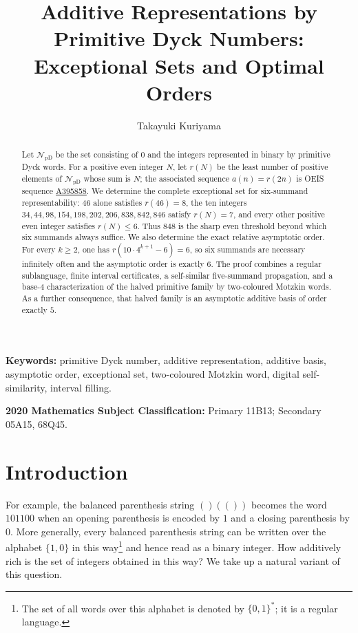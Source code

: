 \documentclass[12pt]{article}
\title{Additive Representations by Primitive Dyck Numbers:\\ Exceptional Sets and Optimal Orders}
\author{Takayuki Kuriyama}
\date{}
\theoremstyle{plain}
\theoremstyle{definition}
\theoremstyle{plain}
\newcommand{\NpD}{\mathcal{N}_{\mathrm{pD}}}
\newcommand{\seqnum}[1]{\href{https://oeis.org/#1}{\rm \underline{#1}}}
\begin{document}
\maketitle

\begin{abstract}
Let $\NpD$ be the set consisting of $0$ and the integers represented in
binary by primitive Dyck words.  For a positive even integer $N$, let $r(N)$
be the least number of positive elements of $\NpD$ whose sum is $N$; the
associated sequence $a(n)=r(2n)$ is OEIS sequence \seqnum{A395858}.  We
determine the complete exceptional set for six-summand representability:
$46$ alone satisfies $r(46)=8$, the ten integers
$34,44,98,154,198,202,206,838,842,846$ satisfy $r(N)=7$, and every other
positive even integer satisfies $r(N)\leq6$.  Thus $848$ is the sharp even
threshold beyond which six summands always suffice.  We also determine the
exact relative asymptotic order.  For every $k\geq2$, one has
$r(10\cdot4^{k+1}-6)=6$, so six summands are necessary infinitely often and the asymptotic order is
exactly $6$.  The proof combines a regular sublanguage, finite interval
certificates, a self-similar five-summand propagation, and a base-$4$
characterization of the halved primitive family by two-coloured Motzkin words.
As a further consequence, that halved family is an asymptotic additive basis
of order exactly $5$.
\end{abstract}

\noindent\textbf{Keywords:} primitive Dyck number, additive
representation, additive basis, asymptotic order, exceptional set,
two-coloured Motzkin word, digital self-similarity, interval filling.

\noindent\textbf{2020 Mathematics Subject Classification:} Primary 11B13;
Secondary 05A15, 68Q45.

\section{Introduction}\label{sec:introduction}

For example, the balanced parenthesis string $()(())$ becomes the word
$101100$ when an opening parenthesis is encoded by $1$ and a closing
parenthesis by $0$.  More generally, every balanced parenthesis string can
be written over the alphabet $\{1,0\}$ in this way\footnote{The set of all
words over this alphabet is denoted by $\{0,1\}^*$; it is a regular
language.} and hence read as a binary integer.  How additively rich is the
set of integers obtained in this way?  We take up a natural variant of this
question.
\end{document}
